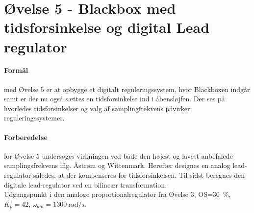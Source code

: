 \documentclass[danish]{article}
\begin{document}
\newpage
\section{Øvelse 5 - Blackbox med tidsforsinkelse og digital Lead regulator}
\paragraph{Formål} med Øvelse 5 er at opbygge et digitalt reguleringssystem, hvor Blackboxen indgår samt er der nu også sættes en tidsforsinkelse ind i åbensløjfen. Der ses på hvorledes tidsforsinkelser og valg af samplingfrekvens påvirker reguleringssystemer.

\paragraph{Forberedelse} for Øvelse 5 undersøges virkningen ved både den højest og lavest anbefalede samplingsfrekvens iflg. Åstrøm og Wittenmark. Herefter designes en analog lead-regulator  således, at der kompenseres for tidsforsinkelsen. Til sidst beregnes den digitale lead-regulator ved en bilineær transformation.\\

Udgangspunkt i den analoge proportionalregulator fra Øvelse 3, OS=\SI{30}{\percent}, $K_p = 42$, $\omega_{\theta m} = \SI{1300}{\radian\per\second}$.
\end{document}

